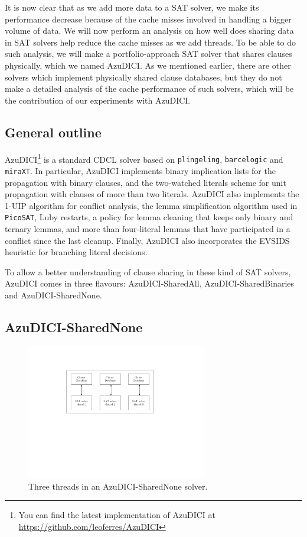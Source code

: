 \documentclass[12pt]{diicc}
\begin{document}
It is now clear that as we add more data to a SAT solver, we make its performance decrease because of the cache misses involved in handling a bigger volume of data. We will now perform an analysis on how well does sharing data in SAT solvers help reduce the cache misses as we add threads. To be able to do such analysis, we will make a portfolio-approach SAT solver that shares clauses physically, which we named AzuDICI. As we mentioned earlier, there are other solvers which implement physically shared clause databases, but they do not make a detailed analysis of the cache performance of such solvers, which will be the contribution of our experiments with AzuDICI.

\subsection{General outline}

AzuDICI\footnote{You can find the latest implementation of AzuDICI at
  \url{https://github.com/leoferres/AzuDICI}} is a standard CDCL
solver based on {\tt plingeling}, {\tt barcelogic} and {\tt miraXT}. In particular, AzuDICI implements binary implication lists for the
propagation with binary clauses, and the two-watched literals scheme
for unit propagation with clauses of more than two
literals. AzuDICI also implements the 1-UIP algorithm for conflict
analysis, the lemma simplification algorithm used in {\tt
  PicoSAT}, Luby restarts, a policy for lemma cleaning that
keeps only binary and ternary lemmas, and more than four-literal
lemmas that have participated in a conflict since the last
cleanup. Finally, AzuDICI also incorporates the EVSIDS heuristic for
branching literal decisions.

To allow a better understanding of clause sharing in these kind of SAT solvers, AzuDICI comes in three flavours: AzuDICI-SharedAll, AzuDICI-SharedBinaries and AzuDICI-SharedNone.

\subsection{AzuDICI-SharedNone}

\begin{figure}[h!]
	\centering
		\includegraphics[width=0.7\textwidth]{sharednone}
	\caption{Three threads in an AzuDICI-SharedNone solver.}
	\label{fig:azu sharednone}
\end{figure}
\end{document}
